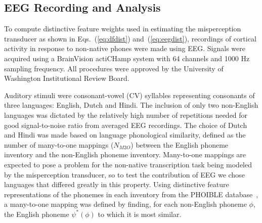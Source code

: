 \subsection{EEG Recording and Analysis}
\label{sec:methods_eeg}

To compute distinctive feature weights used in estimating the misperception
transducer as shown in Eqs.~(\ref{eq:dfdist}) and~(\ref{eq:eegdist}),
recordings of cortical activity in response to non-native phones were
made using EEG. Signals were acquired using a BrainVision actiCHamp 
system with 64 channels and 1000 Hz sampling frequency.
All procedures were approved by the University of Washington Institutional
Review Board.

Auditory stimuli were consonant-vowel
(CV) syllables representing consonants of three languages: English,
Dutch and Hindi. The inclusion of only two non-English languages 
was dictated by the relatively high number of
repetitions needed for good signal-to-noise ratio from averaged
EEG recordings. The choice of Dutch and Hindi was made based on language
phonological similarity, defined as the number of many-to-one mappings
($N_{M2O}$) between the English phoneme inventory
and the non-English phoneme inventory.
Many-to-one mappings are expected to pose a problem for the 
non-native transcription task being modeled by the misperception 
transducer, so to test the contribution of EEG we chose languages that 
differed greatly in this property. 
Using distinctive feature representations of the phonemes in each
inventory from the PHOIBLE database~\cite{phoible}, a many-to-one 
mapping was defined by finding, for each
non-English phoneme $\phi$, the English phoneme $\psi^*(\phi)$ to which
it is most similar.
